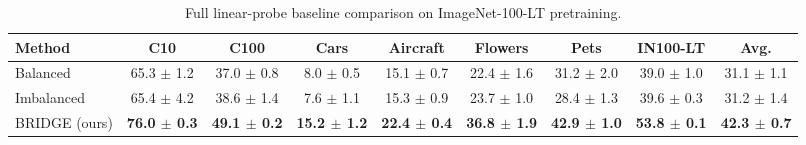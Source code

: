 \begin{table}[H]
\centering
\scriptsize
\setlength{\tabcolsep}{3.5pt}
\caption{Full linear-probe baseline comparison on ImageNet-100-LT pretraining.}
\label{tab:app_baselines_linear_full}
\begin{adjustbox}{width=\textwidth}
\begin{tabular}{l c c c c c c c c}
\toprule
Method & C10 & C100 & Cars & Aircraft & Flowers & Pets & IN100-LT & Avg. \\
\midrule
Balanced & 65.3 {\scriptsize$\pm$ 1.2} & 37.0 {\scriptsize$\pm$ 0.8} & 8.0 {\scriptsize$\pm$ 0.5} & 15.1 {\scriptsize$\pm$ 0.7} & 22.4 {\scriptsize$\pm$ 1.6} & 31.2 {\scriptsize$\pm$ 2.0} & 39.0 {\scriptsize$\pm$ 1.0} & 31.1 {\scriptsize$\pm$ 1.1} \\
Imbalanced & 65.4 {\scriptsize$\pm$ 4.2} & 38.6 {\scriptsize$\pm$ 1.4} & 7.6 {\scriptsize$\pm$ 1.1} & 15.3 {\scriptsize$\pm$ 0.9} & 23.7 {\scriptsize$\pm$ 1.0} & 28.4 {\scriptsize$\pm$ 1.3} & 39.6 {\scriptsize$\pm$ 0.3} & 31.2 {\scriptsize$\pm$ 1.4} \\
BRIDGE (ours) & \textbf{76.0 {\scriptsize$\pm$ 0.3}} & \textbf{49.1 {\scriptsize$\pm$ 0.2}} & \textbf{15.2 {\scriptsize$\pm$ 1.2}} & \textbf{22.4 {\scriptsize$\pm$ 0.4}} & \textbf{36.8 {\scriptsize$\pm$ 1.9}} & \textbf{42.9 {\scriptsize$\pm$ 1.0}} & \textbf{53.8 {\scriptsize$\pm$ 0.1}} & \textbf{42.3 {\scriptsize$\pm$ 0.7}} \\
\bottomrule
\end{tabular}
\end{adjustbox}
\end{table}
